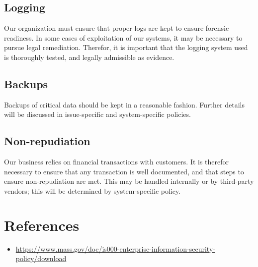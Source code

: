 \documentclass[11pt]{article}
\begin{document}
\subsection{Logging}
\label{sec:orge508fb7}
Our organization must ensure that proper logs are kept to ensure forensic readiness. In some cases of exploitation of our systems, it may be necessary to pursue legal remediation. Therefor, it is important that the logging system used is thoroughly tested, and legally admissible as evidence.
\subsection{Backups}
\label{sec:org4454d08}
Backups of critical data should be kept in a reasonable fashion. Further details will be discussed in issue-specific and system-specific policies.
\subsection{Non-repudiation}
\label{sec:org9140460}
Our business relies on financial transactions with customers. It is therefor necessary to ensure that any transaction is well documented, and that steps to ensure non-repudiation are met. This may be handled internally or by third-party vendors; this will be determined by system-specific policy.

\section{References}
\label{sec:org88100ca}
\begin{itemize}
\item \url{https://www.mass.gov/doc/is000-enterprise-information-security-policy/download}
\end{itemize}
\end{document}
